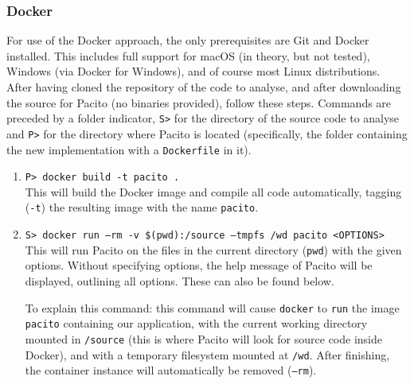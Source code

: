 \subsubsection{Docker}
For use of the Docker approach, the only prerequisites are Git and Docker installed. This includes full support for macOS (in theory, but not tested), Windows (via Docker for Windows), and of course most Linux distributions. After having cloned the repository of the code to analyse, and after downloading the source for Pacito (no binaries provided), follow these steps. Commands are preceded by a folder indicator, {\tt S>} for the directory of the source code to analyse and {\tt P>} for the directory where Pacito is located (specifically, the folder containing the new implementation with a {\tt Dockerfile} in it).
\begin{enumerate}[label=\bf\arabic*)]
    \item {\tt P> docker build -t pacito .} \\ This will build the Docker image and compile all code automatically, tagging ({\tt -t}) the resulting image with the name {\tt pacito}.
    \item {\tt S> docker run --rm -v \$(pwd):/source --tmpfs /wd pacito <OPTIONS>} \\ This will run Pacito on the files in the current directory ({\tt pwd}) with the given options. Without specifying options, the help message of Pacito will be displayed, outlining all options. These can also be found below.
    
    To explain this command: this command will cause {\tt docker} to {\tt run} the image {\tt pacito} containing our application, with the current working directory mounted in {\tt /source} (this is where Pacito will look for source code inside Docker), and with a temporary filesystem mounted at {\tt /wd}. After finishing, the container instance will automatically be removed ({\tt --rm}).
\end{enumerate}

